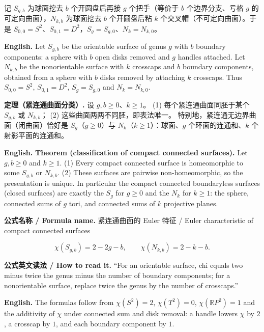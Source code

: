 \documentclass[UTF8,11pt,a4paper]{ctexart}
\newcommand{\EN}[1]{\par\noindent\textbf{English.} #1\par}
\newcommand{\READ}[1]{\par\noindent\textbf{公式英文读法 / How to read it.} #1\par}
\newcommand{\FORMULA}[2]{\par\noindent\textbf{公式名称 / Formula name.} #1 / #2\par}
\begin{document}
\noindent 记 $S_{g,b}$ 为球面挖去 $b$ 个开圆盘后再接 $g$ 个把手（等价于 $b$ 个边界分支、亏格 $g$ 的可定向曲面），$N_{k,b}$ 为球面挖去 $b$ 个开圆盘后粘 $k$ 个交叉帽（不可定向曲面）。于是 $S_{0,0}=S^2$、$S_{0,1}=D^2$，$S_g=S_{g,0}$、$N_k=N_{k,0}$。
\EN{Let $S_{g,b}$ be the orientable surface of genus $g$ with $b$ boundary components: a sphere with $b$ open disks removed and $g$ handles attached. Let $N_{k,b}$ be the nonorientable surface with $k$ crosscaps and $b$ boundary components, obtained from a sphere with $b$ disks removed by attaching $k$ crosscaps. Thus $S_{0,0}=S^2$, $S_{0,1}=D^2$, $S_g=S_{g,0}$ and $N_k=N_{k,0}$.}

\noindent\textbf{定理（紧连通曲面分类）.} 设 $g,b\ge0$、$k\ge1$。
(1) 每个紧连通曲面同胚于某个 $S_{g,b}$ 或 $N_{k,b}$；
(2) 这些曲面两两不同胚，即表法唯一。
特别地，紧连通无边界曲面（闭曲面）恰好是 $S_g$（$g\ge0$）与 $N_k$（$k\ge1$）：球面、$g$ 个环面的连通和、$k$ 个射影平面的连通和。
\EN{\textbf{Theorem (classification of compact connected surfaces).} Let $g,b\ge0$ and $k\ge1$. (1) Every compact connected surface is homeomorphic to some $S_{g,b}$ or $N_{k,b}$. (2) These surfaces are pairwise non-homeomorphic, so the presentation is unique. In particular the compact connected boundaryless surfaces (closed surfaces) are exactly the $S_g$ for $g\ge0$ and the $N_k$ for $k\ge1$: the sphere, connected sums of $g$ tori, and connected sums of $k$ projective planes.}

\FORMULA{紧连通曲面的 Euler 特征}{Euler characteristic of compact connected surfaces}
\[
\chi(S_{g,b})=2-2g-b,\qquad \chi(N_{k,b})=2-k-b .
\]
\READ{``For an orientable surface, chi equals two minus twice the genus minus the number of boundary components; for a nonorientable surface, replace twice the genus by the number of crosscaps.''}
\EN{The formulas follow from $\chi(S^2)=2$, $\chi(T^2)=0$, $\chi(\mathbb RP^2)=1$ and the additivity of $\chi$ under connected sum and disk removal: a handle lowers $\chi$ by $2$, a crosscap by $1$, and each boundary component by $1$.}
\end{document}
